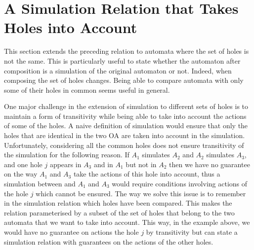 \documentclass[runningheads]{llncs}
\begin{document}






\section{A Simulation Relation that Takes Holes into Account}\label{sec:holes}

This section  extends the preceding relation to automata where the set of holes is not the same. 
This is particularly useful  to state whether the automaton after composition is a simulation of the original automaton or not.
Indeed, when composing the set of  holes changes.
Being able to compare automata with only some of their holes in common seems useful in general.

\medskip
One major challenge in the extension of simulation to different sets of holes is to maintain a form of transitivity while being able to take into account the actions of some of the holes. A naive definition of simulation would ensure that only the holes that are identical in the two OA are taken into account in the simulation. Unfortunately, considering all the common holes does not ensure transitivity of the simulation for the following reason. If $A_1$ simulates $A_2$ and $A_2$ simulates $A_3$, and one hole $j$ appears in $A_3$ and in $A_1$ but not in $A_2$ then we have no guarantee on the way $A_1$ and $A_3$ take the actions of this  hole into account, thus  a simulation between and $A_1$ and $A_3$ would require conditions involving actions of the hole $j$ which cannot be ensured. The way we solve this issue is to remember in the simulation relation which holes have been compared. This makes the relation parameterised by a subset of the set of holes that belong to the two automata that we want to take into account.
This way, in the example above, we would have no guarantee on actions the hole $j$ by transitivity but can state a simulation relation with guarantees on the actions of the other holes.
\end{document}
